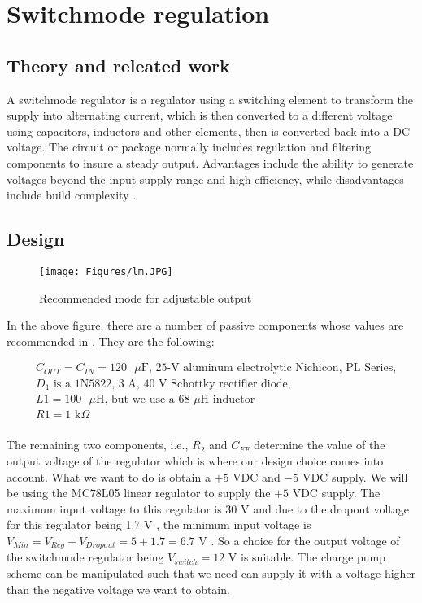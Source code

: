 \chapter{Switchmode regulation}
\section{Theory and releated work} \label{sec:literature_switchmode}

A switchmode regulator is a regulator using a switching element to transform the supply into alternating current, which is then converted to a different voltage using capacitors, inductors and other elements, then is converted back into a DC voltage. The circuit or package normally includes regulation and filtering components to insure a steady output. Advantages include the ability to generate voltages beyond the input supply range and high efficiency, while disadvantages include build complexity \cite{SwitchmodeSite}.

\section{Design} \label{sec:design_switchmode}

\begin{figure}[h]
    \centering
    \texttt{[image: Figures/lm.JPG]}
    \caption{Recommended mode for adjustable output \cite{TI:LM2595}}
    \label{fig:adjustable_LM2595}
\end{figure}

In the above figure, there are a number of passive components whose values are recommended in \cite{TI:LM2595}. They are the following:

\begin{align*} 
&C_{OUT} = C_{IN} = 120 \text{ $\mu$F, 25-V aluminum electrolytic Nichicon, PL Series,}  \\ 
&D_1 \text{ is a 1N5822, 3 A, 40 V Schottky rectifier diode,}\\
&L1 = 100 \text{ $\mu$H, but we use a 68 $\mu$H inductor}\\
&R1 = 1  \text{ k} \Omega \\
\end{align*} 

The remaining two components, i.e., $R_2$ and $C_{FF}$  determine the value of the output voltage of the regulator which is where our design choice comes into account. What we want to do is obtain a  $+5 \text{ VDC}$ and $-5 \text{ VDC}$ supply. We will be using the MC78L05 linear regulator to supply the $+5 \text{ VDC}$ supply. The maximum input voltage to this regulator is 30 V \cite{MC75VReg} and due to the dropout voltage for this regulator being 1.7 V \cite{MC75VReg}, the minimum input voltage is $V_{Min} = V_{Reg} + V_{Dropout} = 5 + 1.7 = 6.7$ V . So a choice for the output voltage of the switchmode regulator being $V_{switch} = 12$ V is suitable. The charge pump scheme can be manipulated such that we need can supply it with a voltage higher than the negative voltage we want to obtain.

